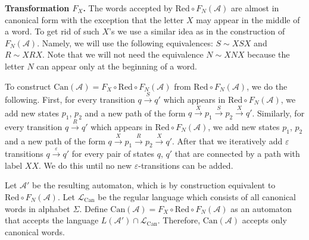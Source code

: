 \documentclass[fontsize=11pt,DIV=13,paper=letter]{scrartcl}
\theoremstyle{definition}
\newcommand{\A}{\mathcal{A}}
\newcommand{\LL}{\mathcal{L}}
\renewcommand{\epsilon}{\varepsilon}
\begin{document}
{\bf Transformation $F_X$.} The words accepted by $\mathrm{Red}\circ F_N(\A)$ are almost in canonical form with the exception that the letter $X$ may appear in the middle of a word. To get rid of such $X$'s we use a similar idea as in the construction of $F_N(\A)$. Namely, we will use the following equivalences: $S\sim \mathit{XSX}$ and $R\sim \mathit{XRX}$. Note that we will not need the equivalence $N\sim \mathit{XNX}$ because the letter $N$ can appear only at the beginning of a word.

To construct $\mathrm{Can}(\A)=F_X\circ \mathrm{Red}\circ F_N(\A)$ from $\mathrm{Red}\circ F_N(\A)$, we do the following. First, for every transition $q\xrightarrow{S} q'$ which appears in $\mathrm{Red}\circ F_N(\A)$, we add new states $p_1$, $p_2$ and a new path of the form $q\xrightarrow{X} p_1\xrightarrow{S} p_2\xrightarrow{X} q'$. Similarly, for every transition $q\xrightarrow{R} q'$ which appears in $\mathrm{Red}\circ F_N(\A)$, we add new states $p_1$, $p_2$ and a new path of the form $q\xrightarrow{X} p_1\xrightarrow{R} p_2\xrightarrow{X} q'$. After that we iteratively add $\epsilon$ transitions $q\xrightarrow{\epsilon} q'$ for every pair of states $q$, $q'$ that are connected by a path with label $\mathit{XX}$. We do this until no new $\epsilon$-transitions can be added. 

Let $\A'$ be the resulting automaton, which is by construction equivalent to $\mathrm{Red}\circ F_N(\A)$. Let $\LL_\mathrm{Can}$ be the regular language which consists of all canonical words in alphabet $\Sigma$. Define $\mathrm{Can}(\A)=F_X\circ \mathrm{Red}\circ F_N(\A)$ as an automaton that accepts the language $L(\A')\cap \LL_\mathrm{Can}$. Therefore, $\mathrm{Can}(\A)$ accepts only canonical words.
\end{document}
